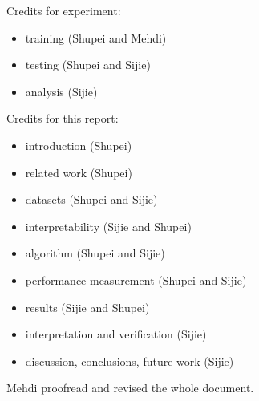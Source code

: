 \documentclass[12pt]{article}
\begin{document}
Credits for experiment:
\begin{itemize}
    \item training (Shupei and Mehdi)
    \item testing (Shupei and Sijie)
    \item analysis (Sijie)
\end{itemize}

Credits for this report:
\begin{itemize}
    \item introduction (Shupei)
    \item related work (Shupei)
    \item datasets (Shupei and Sijie)
    \item interpretability (Sijie and Shupei)
    \item algorithm (Shupei and Sijie)
    \item performance measurement (Shupei and Sijie)
    \item results (Sijie and Shupei)
    \item interpretation and verification (Sijie)
    \item discussion, conclusions, future work (Sijie)
\end{itemize}
Mehdi proofread and revised the whole document.

\newpage



\end{document}
